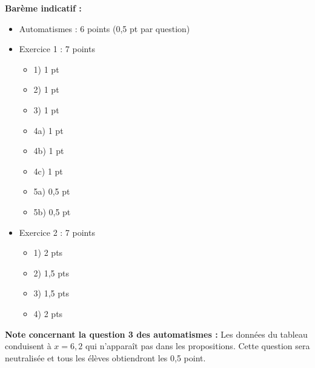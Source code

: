 \documentclass[a4paper,12pt]{article}
\begin{document}
\vspace{1cm}
\textbf{Barème indicatif :}
\begin{itemize}
\item Automatismes : 6 points (0,5 pt par question)
\item Exercice 1 : 7 points
  \begin{itemize}
  \item 1) 1 pt
  \item 2) 1 pt
  \item 3) 1 pt
  \item 4a) 1 pt
  \item 4b) 1 pt
  \item 4c) 1 pt
  \item 5a) 0,5 pt
  \item 5b) 0,5 pt
  \end{itemize}
\item Exercice 2 : 7 points
  \begin{itemize}
  \item 1) 2 pts
  \item 2) 1,5 pts
  \item 3) 1,5 pts
  \item 4) 2 pts
  \end{itemize}
\end{itemize}

\textbf{Note concernant la question 3 des automatismes :} 
Les données du tableau conduisent à \(x = 6,2\) qui n'apparaît pas dans les propositions. Cette question sera neutralisée et tous les élèves obtiendront les 0,5 point.
\end{document}
